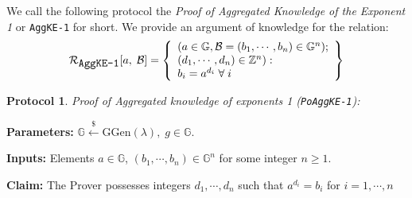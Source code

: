 \documentclass[11pt, lettersize, notitlepage, leqno, footskip=0.6cm]{article}
\newcommand{\bz}{\mathbb Z}
\newcommand{\mc}{\mathcal}
\newcommand{\mb}{\mathbb}
\newcommand{\mr}{\mathrm}
\newcommand{\lamb}{\lambda}
\newtheorem{Prot}[Thm]{Protocol}
\numberwithin{equation}{section}
\begin{document}
We call the following protocol the \textit{Proof of Aggregated Knowledge of the Exponent 1} or \verb|AggKE-1| for short. We provide an argument of knowledge for the relation:
\[
  \mc{R}_{{\protect\verb|AggKE-1|}}[a,\; \mc{B}] = \left\{\begin{array}{l}
    (a\in\mb{G}, \mc{B} = (b_1,\cdots, b_n)\in\mb{G}^n);\\ 
    (d_1,\cdots,d_n)\in\bz^n):  \\
    b_i = a^{d_i}\;\forall\; i
  \end{array}\right\}
\]


\vspace{0.1cm}

\begin{Prot} \normalfont \textit{Proof of Aggregated knowledge of exponents} 1 (\verb|PoAggKE-1|):\end{Prot} \vspace{-0.3cm}

\noindent \textbf{Parameters:} $\mb{G}\xleftarrow{\$} \mr{GGen}(\lamb), \; g\in \mb{G}$.

\noindent \textbf{Inputs:} Elements $a\in\mb{G} $, $(b_1,\cdots,b_n)\in \mb{G}^n$ for some integer $n\geq 1$.

\noindent \textbf{Claim:} The Prover possesses integers $d_1,\cdots, d_n$ such that $a^{d_i} = b_i$ for $i = 1,\cdots, n$
\end{document}
